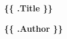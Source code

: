 \begin{titlepage}
  \begin{center}
  \thispagestyle{empty}

  \vspace*{0.5cm}

  \Huge
  \textbf{\{\{ .Title \}\}}

  \vspace{0.5cm}
  \vfill

  \Large
  \textbf{\{\{ .Author \}\}}

  \end{center}
  \clearpage

\end{titlepage}
